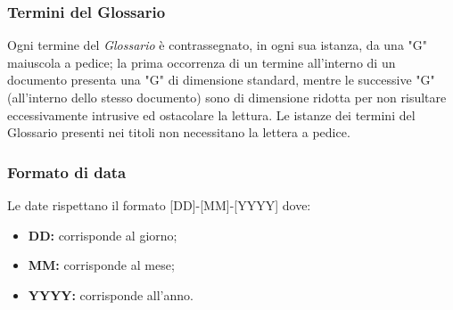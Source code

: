 \subsubsection{Termini del Glossario}\label{ProcessiDiSupportoDocumentazioneNormeTipograficheTerminiDelGlossario}
Ogni termine del \textit{Glossario} è contrassegnato, in ogni sua istanza, da una "G" maiuscola a pedice; la prima occorrenza di un termine all'interno di un documento presenta una "G" di dimensione standard, mentre le successive "G" (all'interno dello stesso documento) sono di dimensione ridotta per non risultare eccessivamente intrusive ed ostacolare la lettura.
Le istanze dei termini del Glossario presenti nei titoli non necessitano la lettera a pedice.
\subsubsection{Formato di data}\label{ProcessiDiSupportoDocumentazioneNormeTipograficheFormatoDiData}
Le date rispettano il formato
[DD]-[MM]-[YYYY] dove:
\begin{itemize}
  \item \textbf{DD:} corrisponde al giorno;
	\item \textbf{MM:} corrisponde al mese;
	\item \textbf{YYYY:} corrisponde all'anno.
\end{itemize}

